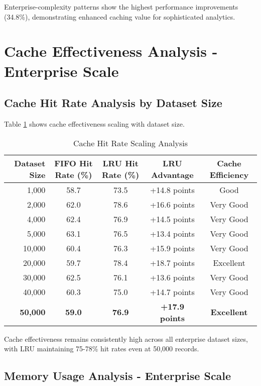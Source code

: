 \documentclass[conference]{IEEEtran}
\begin{document}
Enterprise-complexity patterns show the highest performance improvements (34.8\%), demonstrating enhanced caching value for sophisticated analytics.

\section{Cache Effectiveness Analysis - Enterprise Scale}

\subsection{Cache Hit Rate Analysis by Dataset Size}

Table \ref{tab:enterprise_cache_scaling} shows cache effectiveness scaling with dataset size.

\begin{table}[H]
\centering
\caption{Cache Hit Rate Scaling Analysis}
\label{tab:enterprise_cache_scaling}
\begin{tabular}{@{}rcccc@{}}
\toprule
\textbf{Dataset Size} & \textbf{FIFO Hit Rate (\%)} & \textbf{LRU Hit Rate (\%)} & \textbf{LRU Advantage} & \textbf{Cache Efficiency} \\
\midrule
1,000 & 58.7 & 73.5 & +14.8 points & Good \\
2,000 & 62.0 & 78.6 & +16.6 points & Very Good \\
4,000 & 62.4 & 76.9 & +14.5 points & Very Good \\
5,000 & 63.1 & 76.5 & +13.4 points & Very Good \\
10,000 & 60.4 & 76.3 & +15.9 points & Very Good \\
20,000 & 59.7 & 78.4 & +18.7 points & Excellent \\
30,000 & 62.5 & 76.1 & +13.6 points & Very Good \\
40,000 & 60.3 & 75.0 & +14.7 points & Very Good \\
\textbf{50,000} & \textbf{59.0} & \textbf{76.9} & \textbf{+17.9 points} & \textbf{Excellent} \\
\bottomrule
\end{tabular}
\end{table}

Cache effectiveness remains consistently high across all enterprise dataset sizes, with LRU maintaining 75-78\% hit rates even at 50,000 records.

\subsection{Memory Usage Analysis - Enterprise Scale}
\end{document}
